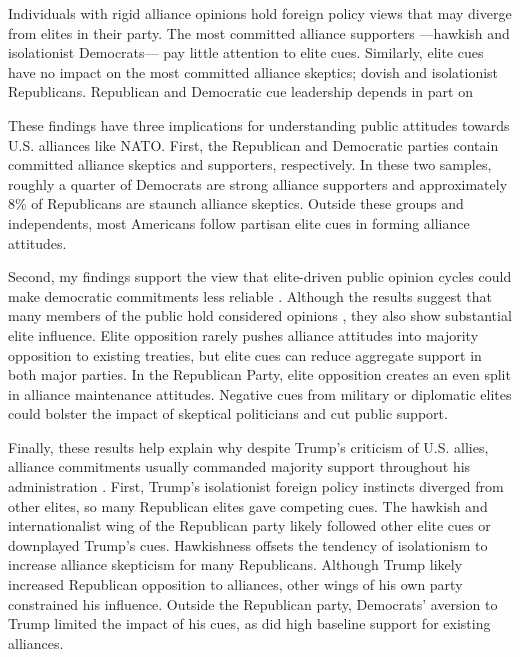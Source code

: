 \documentclass[12pt]{article}
\begin{document}
Individuals with rigid alliance opinions hold foreign policy views that may diverge from elites in their party.  
The most committed alliance supporters ---hawkish and isolationist Democrats--- pay little attention to elite cues.
Similarly, elite cues have no impact on the most committed alliance skeptics; dovish and isolationist Republicans. 
Republican and Democratic cue leadership depends in part on 

These findings have three implications for understanding public attitudes towards U.S. alliances like NATO. 
First, the Republican and Democratic parties contain committed alliance skeptics and supporters, respectively.
In these two samples, roughly a quarter of Democrats are strong alliance supporters and approximately 8\% of Republicans are staunch alliance skeptics.
Outside these groups and independents, most Americans follow partisan elite cues in forming alliance attitudes. 


Second, my findings support the view that elite-driven public opinion cycles could make democratic commitments less reliable \citep{GartzkeGleditsch2004}. 
Although the results suggest that many members of the public hold considered opinions \citep{PageShapiro1992}, they also show substantial elite influence. 
Elite opposition rarely pushes alliance attitudes into majority opposition to existing treaties, but elite cues can reduce aggregate support in both major parties.
In the Republican Party, elite opposition creates an even split in alliance maintenance attitudes. 
Negative cues from military or diplomatic elites could bolster the impact of skeptical politicians and cut public support. 


Finally, these results help explain why despite Trump's criticism of U.S. allies, alliance commitments usually commanded majority support throughout his administration \citep{PewNATO2020}. 
First, Trump's isolationist foreign policy instincts diverged from other elites, so many Republican elites gave competing cues.
The hawkish and internationalist wing of the Republican party likely followed other elite cues or downplayed Trump's cues. 
Hawkishness offsets the tendency of isolationism to increase alliance skepticism for many Republicans.
Although Trump likely increased Republican opposition to alliances, other wings of his own party constrained his influence.
Outside the Republican party, Democrats' aversion to Trump limited the impact of his cues, as did high baseline support for existing alliances. 
\end{document}
